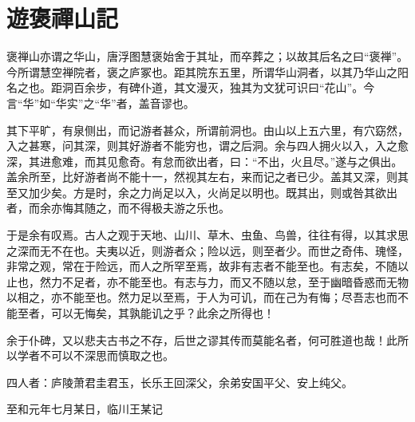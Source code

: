 \section{ 遊褒禪山記}

褒禅山亦谓之华山，唐浮图慧褒始舍于其址，而卒葬之；以故其后名之曰“褒禅”。今所谓慧空禅院者，褒之庐冢也。距其院东五里，所谓华山洞者，以其乃华山之阳名之也。距洞百余步，有碑仆道，其文漫灭，独其为文犹可识曰“花山”。今言“华”如“华实”之“华”者，盖音谬也。

其下平旷，有泉侧出，而记游者甚众，所谓前洞也。由山以上五六里，有穴窈然，入之甚寒，问其深，则其好游者不能穷也，谓之后洞。余与四人拥火以入，入之愈深，其进愈难，而其见愈奇。有怠而欲出者，曰：“不出，火且尽。”遂与之俱出。盖余所至，比好游者尚不能十一，然视其左右，来而记之者已少。盖其又深，则其至又加少矣。方是时，余之力尚足以入，火尚足以明也。既其出，则或咎其欲出者，而余亦悔其随之，而不得极夫游之乐也。

于是余有叹焉。古人之观于天地、山川、草木、虫鱼、鸟兽，往往有得，以其求思之深而无不在也。夫夷以近，则游者众；险以远，则至者少。而世之奇伟、瑰怪，非常之观，常在于险远，而人之所罕至焉，故非有志者不能至也。有志矣，不随以止也，然力不足者，亦不能至也。有志与力，而又不随以怠，至于幽暗昏惑而无物以相之，亦不能至也。然力足以至焉，于人为可讥，而在己为有悔；尽吾志也而不能至者，可以无悔矣，其孰能讥之乎？此余之所得也！

余于仆碑，又以悲夫古书之不存，后世之谬其传而莫能名者，何可胜道也哉！此所以学者不可以不深思而慎取之也。

四人者：庐陵萧君圭君玉，长乐王回深父，余弟安国平父、安上纯父。

至和元年七月某日，临川王某记